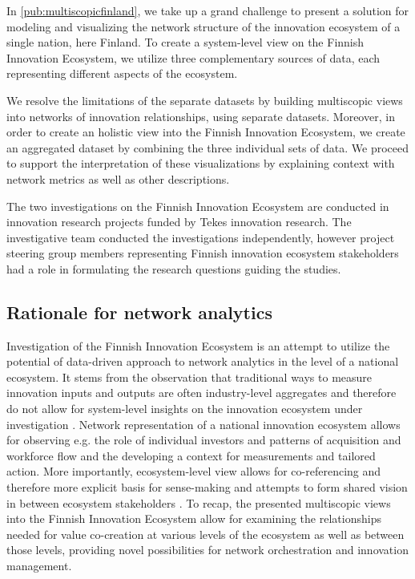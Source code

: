In \ref{pub:multiscopicfinland}, we \cite{Still2013NetworksFinland} take up a grand challenge to present a solution for modeling and visualizing the network structure of the innovation ecosystem of a single nation, here Finland. To create a system-level view on the Finnish Innovation Ecosystem, we utilize three complementary sources of data, each representing different aspects of the ecosystem.

We resolve the limitations of the separate datasets by building multiscopic views into networks of innovation relationships, using separate datasets. Moreover, in order to create an holistic view into the Finnish Innovation Ecosystem, we create an aggregated dataset by combining the three individual sets of data. We proceed to support the interpretation of these visualizations by explaining context with network metrics as well as other descriptions. 

The two investigations on the Finnish Innovation Ecosystem are conducted in innovation research projects funded by Tekes innovation research. The investigative team conducted the investigations independently, however project steering group members representing Finnish innovation ecosystem stakeholders had a role in formulating the research questions guiding the studies.  

\subsection{Rationale for network analytics}

Investigation of the Finnish Innovation Ecosystem is an attempt to utilize the potential of data-driven approach to network analytics in the level of a national ecosystem. It stems from the observation  that traditional ways to measure innovation inputs and outputs are often industry-level aggregates and therefore do not allow for system-level insights on the innovation ecosystem under investigation \citep{Still2012ParadigmDigital}. Network representation of a national innovation ecosystem allows for observing e.g. the role of individual investors and patterns of acquisition and workforce flow and the developing a context for measurements and tailored action. More importantly, ecosystem-level view allows for co-referencing and therefore more explicit basis for sense-making and attempts to form shared vision in between ecosystem stakeholders \citep{Russell2011TransformingOrchestration}. To recap, the presented multiscopic views into the Finnish Innovation Ecosystem allow for examining the relationships needed for value co-creation at various levels of the ecosystem as well as between those levels, providing novel possibilities for network orchestration and innovation management.

